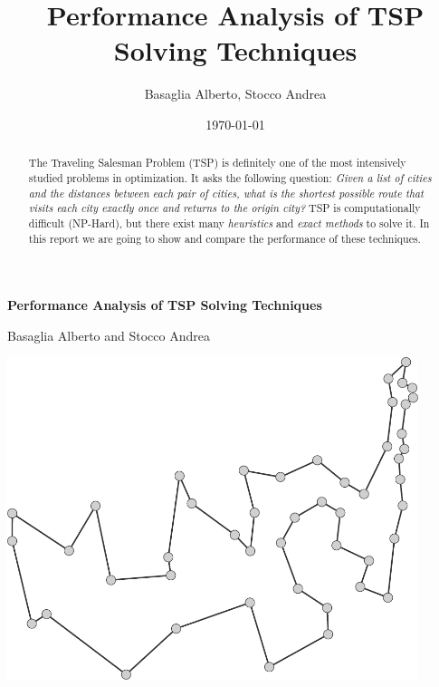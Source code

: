 \documentclass{article}
\title{Performance Analysis of TSP Solving Techniques}
\author{Basaglia Alberto, Stocco Andrea}
\date{\today}
\begin{document}
\begin{titlepage}
    \centering
    \vspace*{\fill}

    \vspace*{0.5cm}

    \huge\bfseries
        Performance Analysis of TSP Solving Techniques

    \vspace*{0.5cm}

    \large Basaglia Alberto and Stocco Andrea

    \vspace*{2cm}

    \includegraphics[width=12cm]{assets/cover.pdf} %


    \vspace*{\fill}
\end{titlepage}

\newpage

\begin{abstract}
The Traveling Salesman Problem (TSP) is definitely one of the most intensively studied problems in optimization.
It asks the following question:
\textit{Given a list of cities and the distances between each pair of cities, what is the shortest possible route
that visits each city exactly once and returns to the origin city?}
TSP is computationally difficult (NP-Hard), but there exist many \textit{heuristics} and \textit{exact methods} to solve it.
In this report we are going to show and compare the performance of these
techniques.
\end{abstract}

\newpage
\tableofcontents
\newpage
\end{document}
